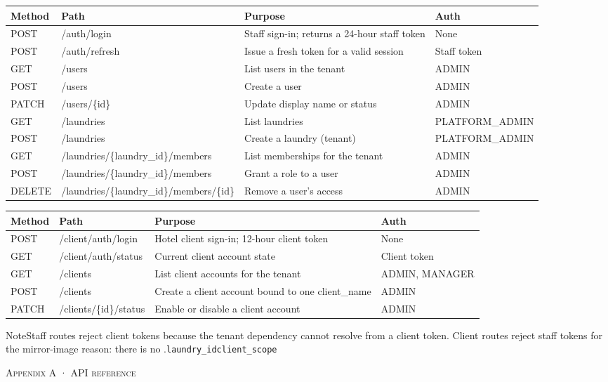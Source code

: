 \documentclass[11pt,a4paper,oneside]{book}
\begin{document}
\begin{center}\small
\begin{tabularx}{\linewidth}{|X|X|X|X|}
\hline
\rowcolor{lightgrey}
\textbf{Method} & \textbf{Path} & \textbf{Purpose} & \textbf{Auth} \\ \hline
POST & /auth/login & Staff sign-in; returns a 24-hour staff token & None \\ \hline
POST & /auth/refresh & Issue a fresh token for a valid session & Staff token \\ \hline
GET & /users & List users in the tenant & ADMIN \\ \hline
POST & /users & Create a user & ADMIN \\ \hline
PATCH & /users/\{id\} & Update display name or status & ADMIN \\ \hline
GET & /laundries & List laundries & PLATFORM\_ADMIN \\ \hline
POST & /laundries & Create a laundry (tenant) & PLATFORM\_ADMIN \\ \hline
GET & /laundries/\{laundry\_id\}/members & List memberships for the tenant & ADMIN \\ \hline
POST & /laundries/\{laundry\_id\}/members & Grant a role to a user & ADMIN \\ \hline
DELETE & /laundries/\{laundry\_id\}/members/\{id\} & Remove a user's access & ADMIN \\ \hline
\end{tabularx}
\end{center}
\begin{center}\small
\begin{tabularx}{\linewidth}{|X|X|X|X|}
\hline
\rowcolor{lightgrey}
\textbf{Method} & \textbf{Path} & \textbf{Purpose} & \textbf{Auth} \\ \hline
POST & /client/auth/login & Hotel client sign-in; 12-hour client token & None \\ \hline
GET & /client/auth/status & Current client account state & Client token \\ \hline
GET & /clients & List client accounts for the tenant & ADMIN, MANAGER \\ \hline
POST & /clients & Create a client account bound to one client\_name & ADMIN \\ \hline
PATCH & /clients/\{id\}/status & Enable or disable a client account & ADMIN \\ \hline
\end{tabularx}
\end{center}
\begin{notebox}NoteStaff routes reject client tokens because the tenant dependency cannot resolve  from a client token. Client routes reject staff tokens for the mirror-image reason: there is no .\texttt{laundry\_id}\texttt{client\_scope}\end{notebox}
\textsc{\small\color{crimson}Appendix A · API reference}\par\medskip
\end{document}
